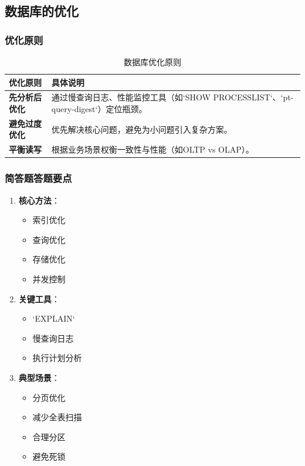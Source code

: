 \documentclass[a4paper,12pt,UTF8,fontset=none]{ctexart}
\begin{document}
\subsection{数据库的优化}
\subsubsection{优化原则}

\begin{table}[h!]
    \centering
    \caption{数据库优化原则}
    \begin{tabular}{@{}>{\centering\arraybackslash}m{7cm}%
                        >{\arraybackslash}m{8cm}@{}}
        \toprule
        \textbf{优化原则} & \textbf{具体说明} \\
        \midrule
        \textbf{先分析后优化} & 
        通过慢查询日志、性能监控工具（如`SHOW PROCESSLIST`、`pt-query-digest`）定位瓶颈。\\
        \textbf{避免过度优化} &
        优先解决核心问题，避免为小问题引入复杂方案。\\
        \textbf{平衡读写} &
        根据业务场景权衡一致性与性能（如OLTP vs OLAP）。\\
        \bottomrule
    \end{tabular}
    
\end{table}

\subsubsection{简答题答题要点}

\begin{enumerate}
    \item \textbf{核心方法}：
    \begin{itemize}
        \item 索引优化
        \item 查询优化
        \item 存储优化
        \item 并发控制
    \end{itemize}
    \item \textbf{关键工具}：
    \begin{itemize}
        \item `EXPLAIN`
        \item 慢查询日志
        \item 执行计划分析
    \end{itemize}
    \item \textbf{典型场景}：
    \begin{itemize}
        \item 分页优化
        \item 减少全表扫描
        \item 合理分区
        \item 避免死锁
    \end{itemize}
\end{enumerate}
\end{document}

